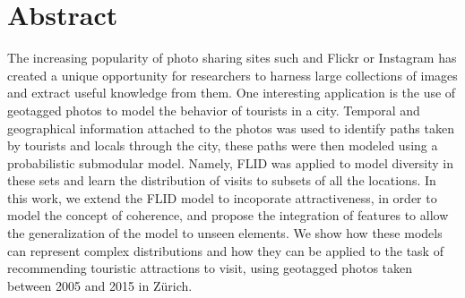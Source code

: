 \chapter*{Abstract}

The increasing popularity of photo sharing sites such and Flickr or Instagram has created a unique opportunity for researchers to harness large collections of images and extract useful knowledge from them. One interesting application is the use of geotagged photos to model the behavior of tourists in a city. Temporal and geographical information attached to the photos was used to identify paths taken by tourists and locals through the city, these paths were then modeled using a probabilistic submodular model. Namely, FLID was applied to model diversity in these sets and learn the distribution of visits to subsets of all the locations. In this work, we extend the FLID model to incoporate attractiveness, in order to model the concept of coherence, and propose the integration of features to allow the generalization of the model to unseen elements. We show how these models can represent complex distributions and how they can be applied to the task of recommending touristic attractions to visit, using geotagged photos taken between 2005 and 2015 in Zürich.